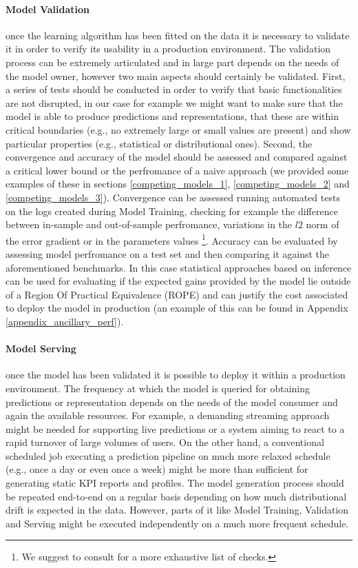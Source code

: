 \paragraph*{Model Validation} once the learning algorithm has been fitted on the data it is necessary to validate it in order to verify its usability in a production environment. The validation process can be extremely articulated and in large part depends on the needs of the model owner, however two main aspects should certainly be validated. First, a series of tests should be conducted in order to verify that basic functionalities are not disrupted, in our case for example we might want to make sure that the model is able to produce predictions and representations, that these are within critical boundaries (e.g., no extremely large or small values are present) and show particular properties (e.g., statistical or distributional ones). Second, the convergence and accuracy of the model should be assessed and compared against a critical lower bound or the perfromance of a naive approach (we provided some examples of these in sections \ref{competing_models_1}, \ref{competing_models_2} and \ref{competing_models_3}). Convergence can be assessed running automated tests on the logs created during Model Training, checking for example the difference between in-sample and out-of-sample perfromance, variations in the $l2$ norm of the error gradient or in the parameters values \footnote{We suggest to consult \cite{bengio2017deep} for a more exhaustive list of checks.}. Accuracy can be evaluated by assessing model perfromance on a test set and then comparing it against the aforementioned benchmarks. In this case statistical approaches based on inference can be used for evaluating if the expected gains provided by the model lie outside of a Region Of Practical Equivalence (ROPE) and can justify the cost associated to deploy the model in production (an example of this can be found in Appendix \ref{appendix_ancillary_perf}).

\paragraph*{Model Serving} once the model has been validated it is possible to deploy it within a production environment. The frequency at which the model is queried for obtaining predictions or representation depends on the needs of the model consumer and again the available resources. For example, a demanding streaming approach might be needed for supporting live predictions or a system aiming to react to a rapid turnover of large volumes of users. On the other hand, a conventional scheduled job executing a prediction pipeline on much more relaxed schedule (e.g., once a day or even once a week) might be more than sufficient for generating static KPI reports and profiles. The model generation process should be repeated end-to-end on a regular basis depending on how much distributional drift is expected in the data. However, parts of it like Model Training, Validation and Serving might be executed independently on a much more frequent schedule. 

